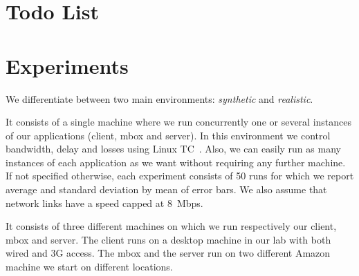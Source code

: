 \documentclass{article}
\begin{document}
\newcommand{\fig}{{Figure}}
\newcommand{\eg}{{e.g.,}}
\newcommand{\ie}{{\it i.e.,}}


\newcommand{\exclude}[1]{}
\newcommand{\showComments}{yes}  %
\newcommand{\note}[2]{
    \ifthenelse{\equal{\showComments}{yes}}{\textcolor{#1}{#2}}{}
}
\newcommand{\TODO}[1]{%
    \addcontentsline{tdo}{todo}{\protect{#1}}%
    \note{red}{TODO: #1} 
}
\newcommand{\question}[2]{\paragraph{Q: #1}\\\textit{A: #2}}
\makeatletter \newcommand{\listoftodos}
{\section*{Todo List} }
\newcommand{\l@todo}
{\@dottedtocline{1}{0em}{2.3em}} \makeatother

\newcommand{\spp}{TruMP\xspace}
\newcommand{\pln}{\texttt{NoEncrypt}\xspace}
\newcommand{\fwd}{\texttt{E2E-TLS}\xspace}
\newcommand{\ssl}{\texttt{SplitTLS}\xspace}
\newcommand{\sppt}{\texttt{\spp}\xspace}

\section{Experiments}
We differentiate between two main environments: \emph{synthetic} and
\emph{realistic}. 

 It consists of a single machine
where we run concurrently one or several instances of our applications
(client, mbox and server). In this environment we control bandwidth,
delay and losses using Linux TC~\cite{tc}. Also, we can easily run as
many instances of each application as we want without requiring any
further machine. If not specified otherwise, each experiment consists
of 50 runs for which we report average and standard deviation by mean
of error bars. We also assume that network links have a speed capped
at 8~Mbps.

 It consists of three different
machines on which we run respectively our client, mbox and server. The
client runs on a desktop machine in our lab with both wired and 3G
access. The mbox and the server run on two different Amazon machine
we start on different locations. 
\end{document}
